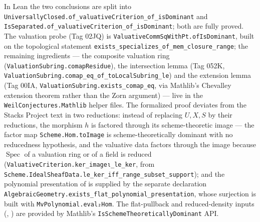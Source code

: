 \begin{remark}
  In Lean the two conclusions are split into
  \texttt{UniversallyClosed.of\_valuativeCriterion\_of\_isDominant} and
  \texttt{IsSeparated.of\_valuativeCriterion\_of\_isDominant}; both are fully
  proved.  The valuation probe (Tag 02JQ) is
  \texttt{ValuativeCommSqWithPt.ofIsDominant}, built on the topological
  statement \texttt{exists\_specializes\_of\_mem\_closure\_range}; the remaining
  ingredients — the composite valuation ring
  (\texttt{ValuationSubring.comapResidue}), the intersection lemma (Tag 052K,
  \texttt{ValuationSubring.comap\_eq\_of\_toLocalSubring\_le}) and the extension
  lemma (Tag 00IA, \texttt{ValuationSubring.exists\_comap\_eq}, via
  Mathlib's Chevalley extension theorem rather than the Zorn argument) — live
  in the \texttt{WeilConjectures.Mathlib} helper files.  The formalized proof
  deviates from the Stacks Project text in two reductions: instead of
  replacing $U,X,S$ by their reductions, the morphism $h$ is factored through
  its scheme-theoretic image — the factor map \texttt{Scheme.Hom.toImage} is
  scheme-theoretically dominant with no reducedness hypothesis, and the
  valuative data factors through the image because $\operatorname{Spec}$ of a
  valuation ring or of a field is reduced
  (\texttt{ValuativeCriterion.ker\_imageι\_le\_ker}, from
  \texttt{Scheme.IdealSheafData.le\_ker\_iff\_range\_subset\_support}); and the
  polynomial presentation of
   is supplied by the
  separate declaration
  \texttt{AlgebraicGeometry.exists\_flat\_polynomial\_presentation}, whose
  surjection is built with \texttt{MvPolynomial.eval₂Hom}.  The flat-pullback and reduced-density
  inputs (,
  ) are provided by Mathlib's
  \texttt{IsSchemeTheoreticallyDominant} API.
\end{remark}

